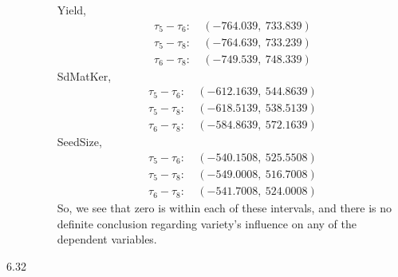 \documentclass[letterpaper,10pt]{article}
\begin{document}
\begin{description}
\begin{enumerate}[label=\alph*.]
Yield,
\begin{align*}
\tau_5-\tau_6: &\ (-764.039,\ 733.839)\\
\tau_5-\tau_8: &\ (-764.639,\ 733.239)\\
\tau_6-\tau_8: &\ (-749.539,\ 748.339)
\end{align*}
SdMatKer,
\begin{align*}
\tau_5-\tau_6: &\ (-612.1639,\ 544.8639)\\
\tau_5-\tau_8: &\ (-618.5139,\ 538.5139)\\
\tau_6-\tau_8: &\ (-584.8639,\ 572.1639)
\end{align*}
SeedSize,
\begin{align*}
\tau_5-\tau_6: &\ (-540.1508,\ 525.5508)\\
\tau_5-\tau_8: &\ (-549.0008,\ 516.7008)\\
\tau_6-\tau_8: &\ (-541.7008,\ 524.0008)
\end{align*}
So, we see that zero is within each of these intervals, and there is no definite conclusion regarding variety's influence on any of the dependent variables.
\end{enumerate}
\item[6.32]\hfill \\

\end{description}
\end{document}
